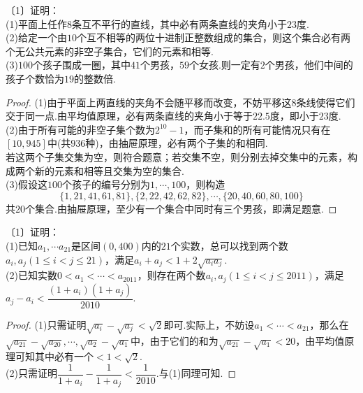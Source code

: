 \documentclass[lang=cn, zihao=4.5]{elegantbook}
\newcommand{\nd}[1]{〔#1〕}
\begin{document}
\begin{example} %
	\nd{1}证明： \\
	(1)平面上任作$8$条互不平行的直线，其中必有两条直线的夹角小于$23$度. \\
	(2)给定一个由$10$个互不相等的两位十进制正整数组成的集合，则这个集合必有两个无公共元素的非空子集合，它们的元素和相等. \\
	(3)$100$个孩子围成一圈，其中$41$个男孩，$59$个女孩.则一定有$2$个男孩，他们中间的孩子个数恰为$19$的整数倍.
\end{example}
\begin{proof}
	(1)由于平面上两直线的夹角不会随平移而改变，不妨平移这$8$条线使得它们交于同一点.由平均值原理，必有两条直线的夹角小于等于$22.5$度，即小于$23$度. \\
	(2)由于所有可能的非空子集个数为$2^{10}-1$，而子集和的所有可能情况只有在$[10,945]$中(共$936$种)，由抽屉原理，必有两个子集的和相同. \\
	若这两个子集交集为空，则符合题意；若交集不空，则分别去掉交集中的元素，构成两个新的元素和相等且交集为空的集合. \\
	(3)假设这$100$个孩子的编号分别为$1, \cdots ,100$，则构造$$\{ 1,21,41,61,81 \}, \{ 2,22,42,62,82 \}, \cdots ,\{ 20,40,60,80,100 \}$$
	共$20$个集合.由抽屉原理，至少有一个集合中同时有三个男孩，即满足题意.
\end{proof}

\begin{example} %
	\nd{1}证明： \\
	(1)已知$a_1, \cdots a_{21}$是区间$(0,400)$内的$21$个实数，总可以找到两个数$a_i,a_j(1 \leq i < j \leq 21)$，满足$a_i+a_j < 1+2\sqrt{a_ia_j}$. \\
	(2)已知实数$0<a_1 < \cdots < a_{2011}$，则存在两个数$a_i,a_j(1 \leq i < j \leq 2011)$，满足$a_j-a_i < \dfrac{(1+a_i)(1+a_j)}{2010}$.
\end{example}
\begin{proof}
	(1)只需证明$\sqrt{a_i}-\sqrt{a_j}<\sqrt{2}$即可.实际上，不妨设$a_1<\cdots <a_{21}$，那么在$\sqrt{a_{21}}-\sqrt{a_{20}}, \cdots ,\sqrt{a_2}-\sqrt{a_1}$中，由于它们的和为$\sqrt{a_{21}}-\sqrt{a_1} < 20$，由平均值原理可知其中必有一个$<1<\sqrt{2}$. \\
	(2)只需证明$\dfrac{1}{1+a_i}-\dfrac{1}{1+a_j} < \dfrac{1}{2010}$.与(1)同理可知.
\end{proof}
\end{document}
